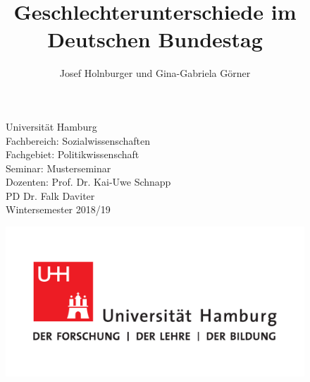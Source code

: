 \documentclass[oneside, 12pt]{scrbook}
\title{Geschlechterunterschiede im Deutschen Bundestag}
\author{Josef Holnburger und Gina-Gabriela Görner}
\date{}
\makeatletter
\newcommand\myName{Josef Holnburger}
\newcommand\myEmail{josef@holnburger.com}
\newcommand\fachbereich{Sozialwissenschaften}
\newcommand\fachgebiet{Politikwissenschaft}
\newcommand\courseOfStudies{Musterseminar}
\newcommand\supervisorType{Dozenten} %
\newcommand\supervisor{Prof. Dr. Kai-Uwe Schnapp \\ PD Dr. Falk Daviter}
\newcommand\currentSemester{Wintersemester 2018/19}
\theoremstyle{definition}
\theoremstyle{definition}
\theoremstyle{definition}
\theoremstyle{remark}
\makeatother
\begin{document}
\maketitle


\begin{titlepage}

\setcounter{page}{-1}    

\begin{figure}[h]
	\begin{minipage}[t]{8.5cm}
	\flushleft 
			Universität Hamburg \\
			Fachbereich: \fachbereich \\
			Fachgebiet: \fachgebiet \\
			Seminar: \courseOfStudies \\ 
			\supervisorType: \supervisor \\
			\currentSemester \\
	\end{minipage}
	\hfill
   \begin{minipage}[t][2cm][b]{0.4\textwidth}
    \flushright\noindent
    	 \noindent\includegraphics{images/UHH-Logo_2010_Farbe_CMYK.pdf}
    \end{minipage}
\end{figure}


\end{titlepage}
\end{document}
